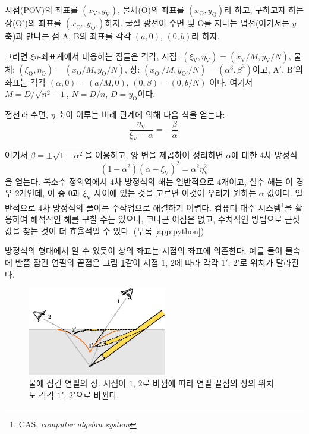 \documentclass[twocolumn]{article}
\begin{document}
시점(POV)의 좌표를 $(x_{\mathrm{V}}^{}, y_{\mathrm{V}}^{})$, 물체($\mathrm{O}$)의 좌표를 $(x_{\mathrm{O}}^{}, y_{\mathrm{O}}^{})$라 하고, 구하고자 하는 상($\mathrm{O'}$)의 좌표를 $(x_{\mathrm{O'}}^{}, y_{\mathrm{O'}}^{})$\라 하자. 굴절 광선이 수면 및 $\mathrm{O}$를 지나는 법선(여기서는 $y$-축)과 만나는 점 A, B의 좌표를 각각 $(a, 0)$, $(0, b)$라 하자. 

그러면 $\xi\eta$-좌표계에서 대응하는 점들은 각각, 시점: $(\xi_{\mathrm{V}}^{}, \eta_{\mathrm{V}}^{})=(x_{\mathrm{V}}^{}/M, y_{\mathrm{V}}^{}/N)$, 물체: $(\xi_{\mathrm{O}}^{}, \eta_{\mathrm{O}}^{})=(x_{\mathrm{O}}^{}/M, y_{\mathrm{O}}^{}/N)$, 상: $(x_{\mathrm{O'}}^{}/M, y_{\mathrm{O'}}^{}/N)=(\alpha^3, \beta^3)$이고, $\mathrm{A'}$, $\mathrm{B'}$의 좌표는 각각 $(\alpha, 0)=(a/M, 0)$, $(0, \beta)=(0, b/N)$ 이다. 여기서 $M=D/\sqrt{n^2-1}$, $N=D/n$, $D=y_{\mathrm{O}}^{}$이다. 

접선과 수면, $\eta$ 축이 이루는 비례 관계에 의해 다음 식을 얻는다:
$$\dfrac{\eta_{\mathrm{V}}^{}}{\xi_{\mathrm{V}}^{}-\alpha}=-\dfrac{\beta}{\alpha}.$$

여기서 $\beta = \pm \sqrt{1-\alpha^2}$을 이용하고, 양 변을 제곱하여 정리하면 $\alpha$에 대한 4차 방정식
\[
\left( 1 - \alpha^2 \right) \left(\alpha-\xi_{\mathrm{V}} \right)^2 = \alpha^2 \eta_{\mathrm{V}}^2
\]
을 얻는다. 복소수 정의역에서 4차 방정식의 해는 일반적으로 4개이고, 실수 해는 이 경우 2개인데, 이 중 $0$과 $\xi_{\mathrm{V}}$ 사이에 있는 것을 고르면 이것이 우리가 원하는 $\alpha$ 값이다. 일반적으로 4차 방정식의 풀이는 수작업으로 해결하기 어렵다. 컴퓨터 대수 시스템\footnote{CAS, \emph{computer algebra system}}을 활용하여 해석적인 해를 구할 수는 있으나, 크나큰 이점은 없고, 수치적인 방법으로 근삿값을 찾는 것이 더 효율적일 수 있다. (부록 \ref{app:python})

방정식의 형태에서 알 수 있듯이 상의 좌표는 시점의 좌표에 의존한다. 예를 들어 물속에 반쯤 잠긴 연필의 끝점은 그림 \ref{fig:pencil_view}\와 같이 시점 $1$, $2$에 따라 각각 $1'$, $2'$로 위치가 달라진다.

\begin{figure}[h]
	\centering
	\includegraphics[width=2.4in]{figs/g43.eps}
	\caption{물에 잠긴 연필의 상. 시점이 $1$, $2$로 바뀜에 따라 연필 끝점의 상의 위치도 각각 $1'$, $2'$으로 바뀐다.}
	\label{fig:pencil_view}
\end{figure}
\end{document}
